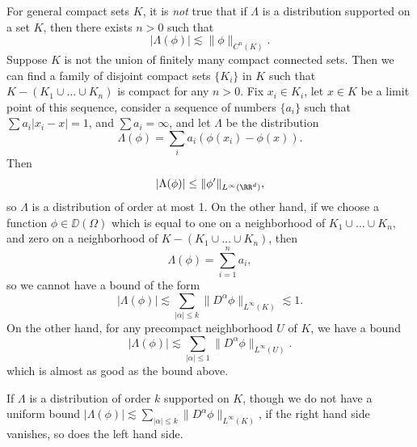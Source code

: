 \begin{remark}
    For general compact sets $K$, it is \emph{not} true that if $\Lambda$ is a distribution supported on a set $K$, then there exists $n > 0$ such that
    \[ |\Lambda(\phi)| \lesssim \| \phi \|_{C^n(K)}. \]
    Suppose $K$ is not the union of finitely many compact connected sets. Then we can find a family of disjoint compact sets $\{ K_i \}$ in $K$ such that $K - (K_1 \cup \dots \cup K_n)$ is compact for any $n > 0$. Fix $x_i \in K_i$, let $x \in K$ be a limit point of this sequence, consider a sequence of numbers $\{ a_i \}$ such that $\sum a_i |x_i - x| = 1$, and $\sum a_i = \infty$, and let $\Lambda$ be the distribution
    \[ \Lambda(\phi) = \sum_i a_i (\phi(x_i) - \phi(x)). \]
    Then
    \[ |\Lambda(\phi)| \leq \| \phi' \|_{L^\infty(\RR^d)}, \]
    so $\Lambda$ is a distribution of order at most 1. On the other hand, if we choose a function $\phi \in \DD(\Omega)$ which is equal to one on a neighborhood of $K_1 \cup \dots \cup K_n$, and zero on a neighborhood of $K - (K_1 \cup \dots \cup K_n)$, then
    \[ \Lambda(\phi) = \sum_{i = 1}^n a_i, \]
    so we cannot have a bound of the form
    \[ |\Lambda(\phi)| \lesssim \sum_{|\alpha| \leq k} \| D^\alpha \phi \|_{L^\infty(K)} \lesssim 1. \]
    On the other hand, for any precompact neighborhood $U$ of $K$, we have a bound
    \[ |\Lambda(\phi)| \lesssim \sum_{|\alpha| \leq 1} \| D^\alpha \phi \|_{L^\infty(U)}. \]
    which is almost as good as the bound above.
\end{remark}

If $\Lambda$ is a distribution of order $k$ supported on $K$, though we do not have a uniform bound $|\Lambda(\phi)| \lesssim \sum_{|\alpha| \leq k} \| D^\alpha \phi \|_{L^\infty(K)}$, if the right hand side vanishes, so does the left hand side.

